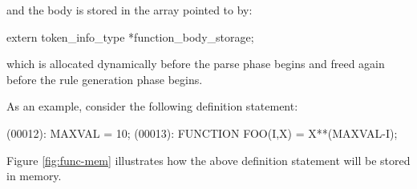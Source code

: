 and the body is stored in the array pointed to by:
\begin{codeexample}
extern token_info_type *function_body_storage;
\end{codeexample}

which is allocated dynamically before the parse phase begins and freed again
before the rule generation phase begins.


As an example, consider the following  definition statement:
\begin{codeexample}
(00012): MAXVAL = 10;
(00013): FUNCTION FOO(I,X) = X**(MAXVAL-I);
\end{codeexample}

Figure \ref{fig:func-mem} illustrates how the above  definition
statement will be stored in memory.

\renewcommand{\qqon}{\begin{scriptsize}\begin{sf}}
\renewcommand{\qqoff}{\end{sf}\end{scriptsize}}

